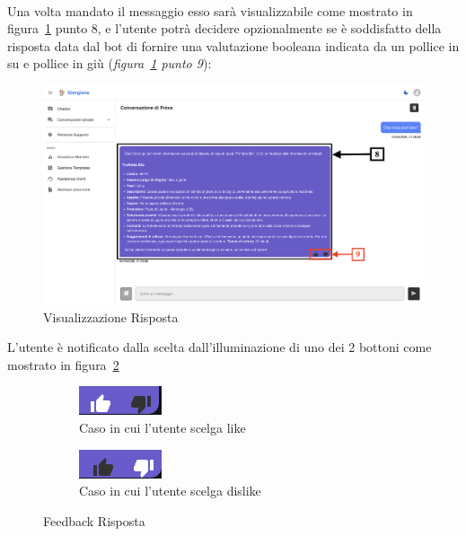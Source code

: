 \\
Una volta mandato il messaggio esso sarà visualizzabile come mostrato in figura~\ref{fig:Visualizzazione Risposta} punto 8, e l'utente potrà decidere opzionalmente se è soddisfatto della risposta data dal bot di fornire una valutazione booleana indicata da un pollice in su e pollice in giù (\textit{figura~\ref{fig:Visualizzazione Risposta} punto 9}):
\begin{figure}[h!]
    \centering
    \includegraphics[width=\textwidth]{./img/SchermataChat3.png}
    \caption{Visualizzazione Risposta}
    \label{fig:Visualizzazione Risposta}
\end{figure}
L'utente è notificato dalla scelta dall'illuminazione di uno dei 2 bottoni come mostrato in figura~\ref{fig:likedislike}
\begin{figure}[h!]
    \centering
    \begin{subfigure}{0.2\textwidth}
        \centering
        \includegraphics[width=\textwidth]{./img/like.png}
        \caption{Caso in cui l'utente scelga like}
    \end{subfigure}
    \hspace{0.05\textwidth}
    \begin{subfigure}{0.2\textwidth}
        \centering
        \includegraphics[width=\textwidth]{./img/dislike.png}
        \caption{Caso in cui l'utente scelga dislike}
    \end{subfigure}
    \caption{Feedback Risposta}
    \label{fig:likedislike}
\end{figure}